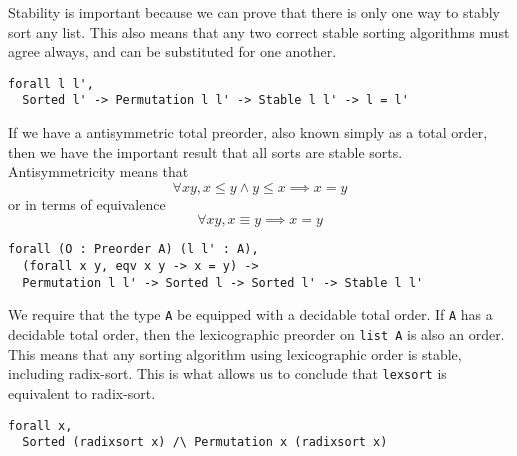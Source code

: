 \documentclass[11pt]{article}
\begin{document}
Stability is important because we can prove that there is only one way
to stably sort any list. This also means that any two correct stable
sorting algorithms must agree always, and can be substituted for one another.

\begin{theorem}[StableUnique]
\begin{verbatim}
forall l l',
  Sorted l' -> Permutation l l' -> Stable l l' -> l = l'
\end{verbatim}
\end{theorem}

If we have a antisymmetric total preorder, also known simply as a
total order, then we have the important result that all sorts are
stable sorts. Antisymmetricity means that
\begin{equation*}
  \forall x y, x \leq y \wedge y \leq x \implies x = y
\end{equation*}
or in terms of equivalence
\begin{equation*}
  \forall x y, x \equiv y \implies x = y
\end{equation*}

\begin{theorem}[OrderStable]
\begin{verbatim}
forall (O : Preorder A) (l l' : A),
  (forall x y, eqv x y -> x = y) ->
  Permutation l l' -> Sorted l -> Sorted l' -> Stable l l'
\end{verbatim}
\end{theorem}

We require that the type \verb|A| be equipped with a decidable total
order. If \verb|A| has a decidable total order, then the lexicographic
preorder on \verb|list A| is also an order. This means that any
sorting algorithm using lexicographic order is stable, including
radix-sort. This is what allows us to conclude that \verb|lexsort| is
equivalent to radix-sort.

\begin{theorem}
\begin{verbatim}
forall x,
  Sorted (radixsort x) /\ Permutation x (radixsort x)
\end{verbatim}
\end{theorem}

\nocite{*}

{}


\end{document}
